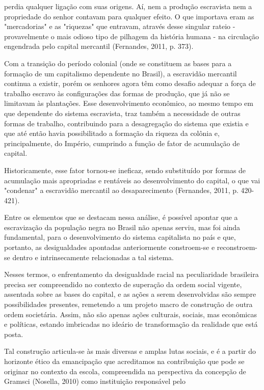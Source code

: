  perdia qualquer ligação com suas origens. Aí, nem a produção escravista nem a
 propriedade do senhor contavam para qualquer efeito. O que importava eram as
 "mercadorias" e as "riquezas" que entravam, através desse singular rateio -
 provavelmente o mais odioso tipo de pilhagem da história humana - na circulação
 engendrada pelo capital mercantil (Fernandes,
 2011, p. 373).\par Com a transição do período colonial (onde se constituem as bases para a formação de
 um capitalismo dependente no Brasil), a escravidão mercantil continua a existir,
 porém os senhores agora têm como desafio adequar a força de trabalho escravo às
 configurações das formas de produção, que já não se limitavam às plantações. Esse
 desenvolvimento econômico, ao mesmo tempo em que dependente do sistema escravista,
 traz também a necessidade de outras formas de trabalho, contribuindo para a
 desagregação do sistema que existia e que até então havia possibilitado a formação da
 riqueza da colônia e, principalmente, do Império, cumprindo a função de fator de
 acumulação de capital.\par Historicamente, esse fator tornou-se ineficaz, sendo substituído por formas de
 acumulação mais apropriadas e rentáveis ao desenvolvimento do capital, o que vai
 "condenar" a escravidão mercantil ao desaparecimento (Fernandes, 2011, p. 420-421).\par Entre os elementos que se destacam nessa análise, é possível apontar que a
 escravização da população negra no Brasil não apenas serviu, mas foi ainda
 fundamental, para o desenvolvimento do sistema capitalista no país e que, portanto,
 as desigualdades apontadas anteriormente constroem-se e reconstroem-se dentro e
 intrinsecamente relacionadas a tal sistema.\par Nesses termos, o enfrentamento da desigualdade racial na peculiaridade brasileira
 precisa ser compreendido no contexto de superação da ordem social vigente, assentada
 sobre as bases do capital, e as ações a serem desenvolvidas são sempre possibilidades
 presentes, remetendo a um projeto macro de construção de outra ordem societária.
 Assim, não são apenas ações culturais, sociais, mas econômicas e políticas, estando
 imbricadas no ideário de transformação da realidade que está posta.\par Tal construção articula-se às mais diversas e amplas lutas sociais, e é a partir do
 horizonte ético da emancipação que acreditamos na contribuição que pode se originar
 no contexto da escola, compreendida na perspectiva da concepção de Gramsci (Nosella, 2010) como instituição responsável pelo
